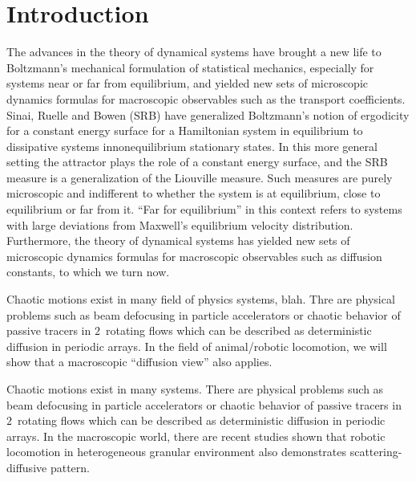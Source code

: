 

\section{Introduction}

The advances in the theory of dynamical systems have brought a new life
to Boltzmann's mechanical formulation of statistical mechanics,
especially for systems near or far from equilibrium, and yielded new sets
of microscopic dynamics formulas for macroscopic observables such as the
transport coefficients. Sinai,
Ruelle and Bowen (SRB) have generalized Boltzmann's notion of ergodicity
for a constant energy surface for a Hamiltonian system in equilibrium to
dissipative systems in{nonequilibrium} stationary states. In this more
general setting the attractor plays the role of a constant energy
surface, and the SRB measure is a generalization of the Liouville
measure. Such measures are purely microscopic and indifferent to whether
the system is at equilibrium, close to equilibrium or far from it. ``Far
for equilibrium'' in this context refers to systems with large deviations
from Maxwell's equilibrium velocity distribution. Furthermore, the theory
of dynamical systems has yielded new sets of microscopic dynamics
formulas for macroscopic observables such as diffusion constants, to
which we turn now.
%
%


Chaotic motions exist in many field of physics systems, blah. Thre are
physical problems such as beam defocusing in particle accelerators or
chaotic behavior of passive tracers in $2$\dmn\ rotating flows which can
be described as deterministic diffusion in periodic arrays. In the field
of animal/robotic locomotion, we will show that a macroscopic ``diffusion
view'' also applies.

Chaotic motions exist in many systems. There are physical problems such
as beam defocusing in particle accelerators 
or chaotic behavior of passive tracers in $2$\dmn\ rotating
flows which can be described as deterministic
diffusion in periodic arrays. In the macroscopic world, there are recent
studies shown that robotic locomotion in heterogeneous granular
environment also demonstrates scattering-diffusive pattern.

